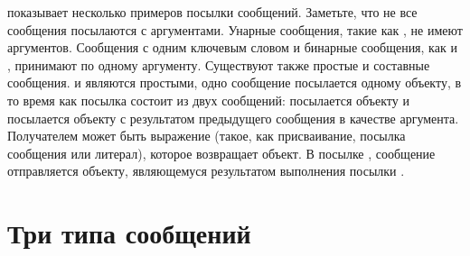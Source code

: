 \documentclass[a4paper,10pt,twoside]{book}
\begin{document}
 показывает несколько примеров посылки сообщений.
Заметьте, что не все сообщения посылаются с аргументами. Унарные сообщения, такие как , не имеют аргументов. Сообщения с одним ключевым словом и бинарные сообщения, как  и , принимают по одному аргументу.
Существуют также простые и составные сообщения.  и  являются простыми, одно сообщение посылается одному объекту, в то время как посылка  состоит из двух сообщений:  посылается объекту  и  посылается объекту  с результатом предыдущего сообщения в качестве аргумента.
Получателем может быть выражение (такое, как присваивание, посылка сообщения или литерал), которое возвращает объект. В посылке , сообщение  отправляется объекту, являющемуся результатом выполнения посылки .


\section{Три типа сообщений}
\end{document}
